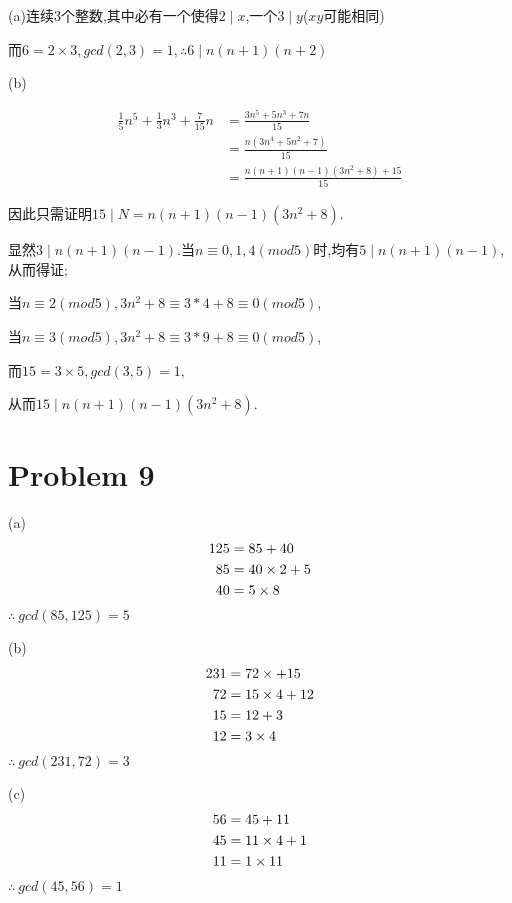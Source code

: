\documentclass{article}
\begin{document}
(a)连续3个整数,其中必有一个使得$2\mid x$,一个$3\mid y$($xy$可能相同)

而$6=2\times 3,gcd(2,3)=1,\therefore 6\mid n(n+1)(n+2)$

(b)

\begin{equation}
    \begin{split}
        \frac{1}{5} n^{5}+\frac{1}{3} n^{3}+\frac{7}{15} n &= \frac{3n^{5}+5n^{3}+7n}{15}\\
        &= \frac{n(3n^{4}+5n^{2}+7)}{15}\\
        &= \frac{n(n+1)(n-1)(3n^{2}+8)+15}{15}
    \end{split}
\end{equation}

因此只需证明$15 \mid N = n(n+1)(n-1)(3n^{2}+8)$.

显然$3\mid n(n+1)(n-1)$.当$n\equiv 0,1,4(mod5)$时,均有$5\mid n(n+1)(n-1)$,从而得证;

当$n\equiv 2(mod5),3n^{2}+8\equiv 3*4+8\equiv 0(mod5)$,

当$n\equiv 3(mod5),3n^{2}+8\equiv 3*9+8\equiv 0(mod5)$,

而$15=3\times 5,gcd(3,5)=1,$

从而$15\mid n(n+1)(n-1)(3n^{2}+8)$.


\section*{Problem 9}

(a) 
\begin{equation} \begin{split}
    \notag
    125 &= 85 + 40 \\
      85 &= 40\times 2 + 5 \\
      40 &= 5\times 8
    \end{split} \end{equation}
$\therefore\ gcd(85,125)=5$

(b) 
\begin{equation} \begin{split}
    \notag
    231 &= 72\times  + 15 \\
        72 &= 15\times 4 + 12 \\
        15 &= 12 + 3\\
        12 &= 3\times 4
    \end{split} \end{equation}
$\therefore\ gcd(231,72)=3$

(c) 
\begin{equation} \begin{split}
    \notag
    56 &= 45  + 11 \\
        45 &= 11\times 4 + 1 \\
        11 &= 1\times 11\\
    \end{split} \end{equation}
$\therefore\ gcd(45,56)=1$
\end{document}
